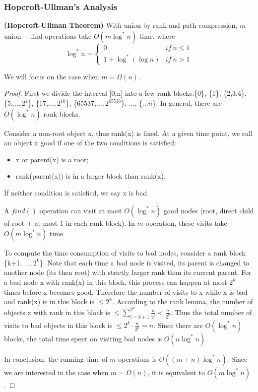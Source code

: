 \subsubsection{Hopcroft-Ullman's Analysis}
\begin{theorem} \textbf{(Hopcroft-Ullman Theorem)}
With union by rank and path compression, $m$ union + find operations take $O(m\log^*n)$ time, where 
\begin{equation*}
\log^*n=\begin{cases}
0&if\:n\leq 1\\
1+\log^*(\log n)&if\:n>1
\end{cases}
\end{equation*}
\end{theorem}
We will focus on the case when $m=\Omega(n).$
\begin{proof}
First we divide the interval [0,n] into a few rank blocks:\{0\}, \{1\}, \{2,3,4\}, \{5,$\dots,2^4$\}, \{17,$\dots,2^16$\}, \{65537,$\dots,2^65536$\}, $\dots$, \{...$n$\}. In general, there are $O(\log^*n)$ rank blocks. 

Consider a non-root object x, thus rank(x) is fixed. At a given time point, we call an object x good if one of the two conditions is satisfied:
\begin{itemize}
\item x or parent(x) is a root;
\item rank(parent(x)) is in a larger block than rank(x). 
\end{itemize}
If neither condition is satisfied, we say x is bad. 

A $find()$ operation can visit at most $O(\log^*n)$ good nodes (root, direct child of root + at most 1 in each rank block). In $m$ operation, these visits take $O(m\log^*n)$ time. 

To compute the time consumption of visits to bad nodes, consider a rank block \{k+1, $\dots, 2^k$\}. Note that each time a bad node is visited, its parent is changed to another node (its then root) with strictly larger rank than its current parent. For a bad node x with rank(x) in this block, this process can happen at most $2^k$ times before x becomes good. Therefore the number of visits to x while x is bad and rank(x) is in this block is $\leq 2^k$. According to the rank lemma, the number of objects x with rank in this block is $\leq\sum\limits_{i=k+1}^{2^k}\frac{n}{2^i}<\frac{n}{2^k}$. Thus the total number of visits to bad objects in this block is $\leq 2^k\cdot\frac{n}{2^k}=n$. Since there are $O(\log^* n)$ blocks, the total time spent on visiting bad nodes is $O(n\log^*n)$. 

In conclusion, the running time of $m$ operations is $O((m+n)\log^*n)$. Since we are interested in the case when $m=\Omega(n)$, it is equivalent to $O(m\log^*n)$. 
\end{proof}
